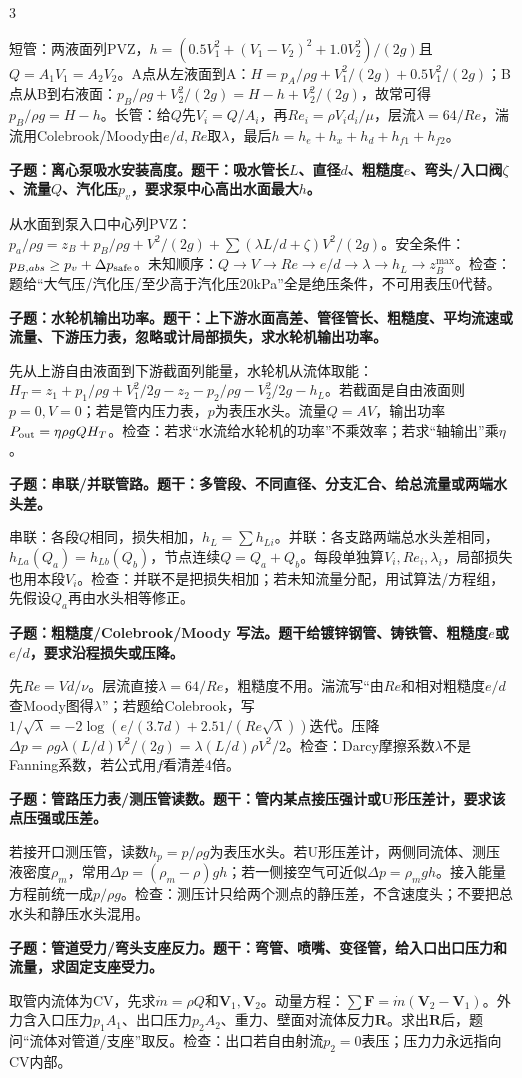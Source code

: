 \documentclass[a4paper]{article}
\newcommand{\qt}[1]{\vspace{0.04pt}\colorbox{Q}{\parbox{\dimexpr\linewidth-2\fboxsep}{\color{white}\bfseries #1}}\par}
\newcommand{\ans}[1]{\colorbox{G}{\parbox{\dimexpr\linewidth-2\fboxsep}{#1}}\par}
\begin{document}
\begin{multicols}{3}
\ans{短管：两液面列PVZ，$h=(0.5V_1^2+(V_1-V_2)^2+1.0V_2^2)/(2g)$且$Q=A_1V_1=A_2V_2$。A点从左液面到A：$H=p_A/\rho g+V_1^2/(2g)+0.5V_1^2/(2g)$；B点从B到右液面：$p_B/\rho g+V_2^2/(2g)=H-h+V_2^2/(2g)$，故常可得$p_B/\rho g=H-h$。长管：给$Q$先$V_i=Q/A_i$，再$Re_i=\rho V_id_i/\mu$，层流$\lambda=64/Re$，湍流用Colebrook/Moody由$e/d,Re$取$\lambda$，最后$h=h_e+h_x+h_d+h_{f1}+h_{f2}$。}
\qt{子题：离心泵吸水安装高度。题干：吸水管长$L$、直径$d$、粗糙度$e$、弯头/入口阀$\zeta$、流量$Q$、汽化压$p_v$，要求泵中心高出水面最大$h$。}
\ans{从水面到泵入口中心列PVZ：$p_a/\rho g=z_B+p_B/\rho g+V^2/(2g)+\sum(\lambda L/d+\zeta)V^2/(2g)$。安全条件：$p_{B,abs}\ge p_v+\Delta p_{\rm safe}$。未知顺序：$Q\to V\to Re\to e/d\to\lambda\to h_L\to z_B^{\max}$。检查：题给“大气压/汽化压/至少高于汽化压20kPa”全是绝压条件，不可用表压0代替。}
\qt{子题：水轮机输出功率。题干：上下游水面高差、管径管长、粗糙度、平均流速或流量、下游压力表，忽略或计局部损失，求水轮机输出功率。}
\ans{先从上游自由液面到下游截面列能量，水轮机从流体取能：$H_T=z_1+p_1/\rho g+V_1^2/2g-z_2-p_2/\rho g-V_2^2/2g-h_L$。若截面是自由液面则$p=0,V=0$；若是管内压力表，$p$为表压水头。流量$Q=AV$，输出功率$P_{\rm out}=\eta\rho gQH_T$。检查：若求“水流给水轮机的功率”不乘效率；若求“轴输出”乘$\eta$。}
\qt{子题：串联/并联管路。题干：多管段、不同直径、分支汇合、给总流量或两端水头差。}
\ans{串联：各段$Q$相同，损失相加，$h_L=\sum h_{Li}$。并联：各支路两端总水头差相同，$h_{La}(Q_a)=h_{Lb}(Q_b)$，节点连续$Q=Q_a+Q_b$。每段单独算$V_i,Re_i,\lambda_i$，局部损失也用本段$V_i$。检查：并联不是把损失相加；若未知流量分配，用试算法/方程组，先假设$Q_a$再由水头相等修正。}
\qt{子题：粗糙度/Colebrook/Moody 写法。题干给镀锌钢管、铸铁管、粗糙度$e$或$e/d$，要求沿程损失或压降。}
\ans{先$Re=Vd/\nu$。层流直接$\lambda=64/Re$，粗糙度不用。湍流写“由$Re$和相对粗糙度$e/d$查Moody图得$\lambda$”；若题给Colebrook，写$1/\sqrt\lambda=-2\log(e/(3.7d)+2.51/(Re\sqrt\lambda))$迭代。压降$\Delta p=\rho g\lambda(L/d)V^2/(2g)=\lambda(L/d)\rho V^2/2$。检查：Darcy摩擦系数$\lambda$不是Fanning系数，若公式用$f$看清差4倍。}
\qt{子题：管路压力表/测压管读数。题干：管内某点接压强计或U形压差计，要求该点压强或压差。}
\ans{若接开口测压管，读数$h_p=p/\rho g$为表压水头。若U形压差计，两侧同流体、测压液密度$\rho_m$，常用$\Delta p=(\rho_m-\rho)gh$；若一侧接空气可近似$\Delta p=\rho_mgh$。接入能量方程前统一成$p/\rho g$。检查：测压计只给两个测点的静压差，不含速度头；不要把总水头和静压水头混用。}
\qt{子题：管道受力/弯头支座反力。题干：弯管、喷嘴、变径管，给入口出口压力和流量，求固定支座受力。}
\ans{取管内流体为CV，先求$\dot m=\rho Q$和$\bm V_1,\bm V_2$。动量方程：$\sum\bm F=\dot m(\bm V_2-\bm V_1)$。外力含入口压力$p_1A_1$、出口压力$p_2A_2$、重力、壁面对流体反力$\bm R$。求出$\bm R$后，题问“流体对管道/支座”取反。检查：出口若自由射流$p_2=0$表压；压力力永远指向CV内部。}

\end{multicols}
\end{document}
